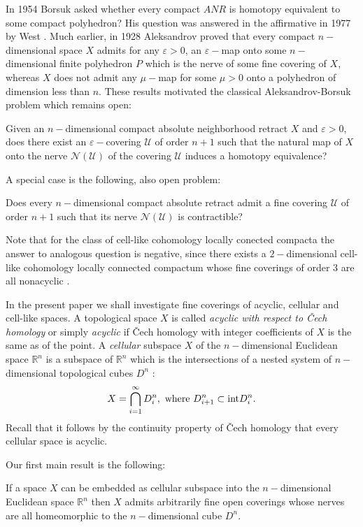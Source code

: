 In 1954 Borsuk \cite{Bor}
asked  whether every
compact $ANR$ is homotopy
equivalent to some
compact polyhedron?
His question was
answered in the affirmative in 1977 by West \cite{W}.
Much earlier, in 1928 Aleksandrov \cite{A1928} proved that  
every compact $n-$dimensional
space $X$ admits for any $\varepsilon >0$,
an $\varepsilon-$map onto some
$n-$dimensional finite polyhedron $P$
which is the nerve of some fine
covering of $X$, whereas $X$
does not admit any $\mu-$map
for
some
$\mu >0$ 
onto a polyhedron of dimension less than $n$.
These results
motivated
the  
classical Aleksandrov-Borsuk problem which remains open:

\begin{prb}
Given an  $n-$dimensional compact
absolute neighborhood retract
$X$
and 
$\varepsilon >0$, does there exist
an $\varepsilon-$covering $\mathcal{U}$ of order
$n+1$ such that the natural map of  $X$ onto the nerve
$\mathcal{N}(\mathcal{U})$ of the covering $\mathcal{U}$
induces a homotopy equivalence?
\end{prb}

A special case  is the following, also open problem:

\begin{prb}\label{AR}
Does every
$n-$dimensional
compact absolute retract 
admit a
fine covering
$\mathcal{U}$ of order $n+1$ such that its nerve
$\mathcal{N}(\mathcal{U})$
is contractible?
\end{prb}

Note that for the class
of cell-like cohomology locally conected compacta
the answer 
to
analogous
question is negative, since there exists a
$2-$dimensional cell-like cohomology locally connected compactum
whose fine coverings of order 3 are all nonacyclic \cite{KaUSSR,
KaTajik}.

In the present paper we shall investigate fine coverings of acyclic,
cellular and cell-like spaces. A topological space $X$ is 
called {\it acyclic with respect to {\v
C}ech homology} or simply {\it acyclic} if {\v C}ech homology with
integer coefficients of $X$ is the same as of the point. A {\it
cellular} subspace $X$ of the $n-$dimensional Euclidean space
$\mathbb{R}^n$ is a subspace of $\mathbb{R}^n$ which is the
intersections of a nested system of  $n-$dimensional topological
cubes $D^n$ :
$$X = \bigcap_{i=1}^{\infty}D^n_i, \ \mbox{where} \ D^n_{i+1} \subset {\rm
int} D^n_i.$$ Recall that it follows
by the continuity property of
{\v C}ech homology  that
every cellular space is acyclic.

Our first main result is the following:
\begin{thm}\label{Thm:Main}
If a space $X$ can be embedded as cellular subspace into the
$n-$dimensional Euclidean space $\mathbb{R}^n$ then $X$
admits
arbitrarily fine open coverings whose nerves are all
homeomorphic to the $n-$dimensional cube
$D^n.$
\end{thm}

